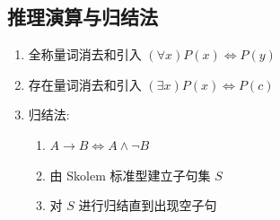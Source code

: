 \documentclass[11pt,a4paper,twocolumn,fleqn]{article} %
\begin{document}
\subsection{推理演算与归结法} %
\label{sub:reasoning_for_predicate}
\begin{enumerate}
	\item 全称量词消去和引入
	$(\forall x) P(x) \Leftrightarrow P(y)$
	\item 存在量词消去和引入
	$(\exists x) P(x) \Leftrightarrow P(c)$
	\item 归结法: 
	\begin{enumerate}
		\item $A\to B \Leftrightarrow A\land \lnot B$
		\item 由 Skolem 标准型建立子句集 $S$
		\item 对 $S$ 进行归结直到出现空子句
	\end{enumerate}
\end{enumerate}
\end{document}
